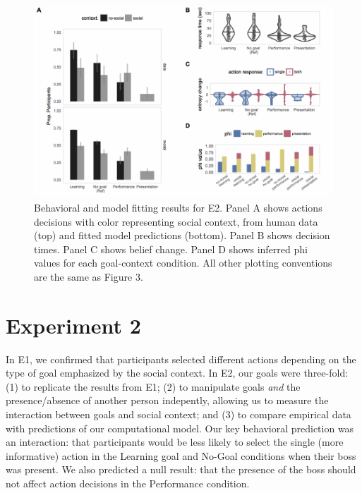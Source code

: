 \documentclass[10pt, letterpaper]{article}
\newenvironment{CodeChunk}{}{}
\begin{document}
\begin{CodeChunk}
\begin{figure}[tb]

{\centering \includegraphics[width=0.95\linewidth]{figs/e2_results-1} 

}

\caption[Behavioral and model fitting results for E2]{Behavioral and model fitting results for E2. Panel A shows actions decisions with color representing social context, from human data (top) and fitted model predictions (bottom). Panel B shows decision times. Panel C shows belief change. Panel D shows inferred phi values for each goal-context condition. All other plotting conventions are the same as Figure 3.}\label{fig:e2_results}
\end{figure}
\end{CodeChunk}

\section{Experiment 2}\label{experiment-2}

In E1, we confirmed that participants selected different actions
depending on the type of goal emphasized by the social context. In E2,
our goals were three-fold: (1) to replicate the results from E1; (2) to
manipulate goals \emph{and} the presence/absence of another person
indepently, allowing us to measure the interaction between goals and
social context; and (3) to compare empirical data with predictions of
our computational model. Our key behavioral prediction was an
interaction: that participants would be less likely to select the single
(more informative) action in the Learning goal and No-Goal conditions
when their boss was present. We also predicted a null result: that the
presence of the boss should not affect action decisions in the
Performance condition.
\end{document}
